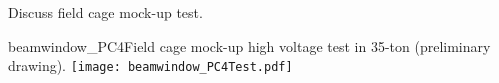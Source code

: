 Discuss field cage mock-up test.
\begin{cdrfigure}{beamwindow_PC4}{Field cage mock-up high voltage test in 35-ton (preliminary drawing).}
  \texttt{[image: beamwindow\_PC4Test.pdf]}
\end{cdrfigure}


